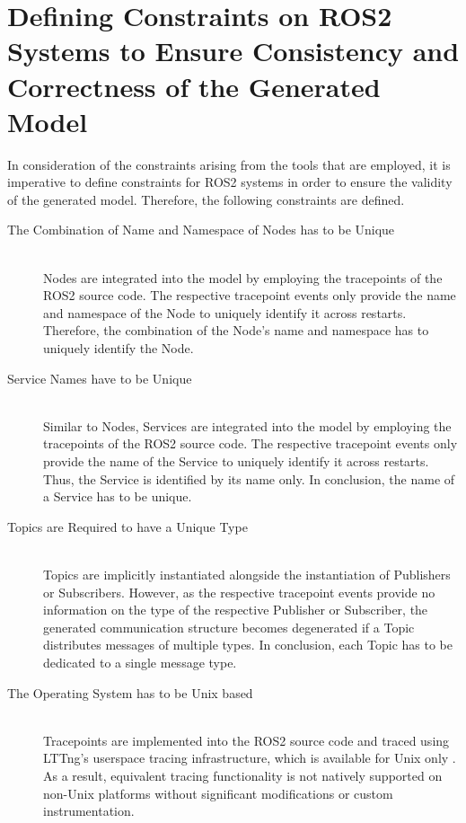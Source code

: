     \section{Defining Constraints on ROS2 Systems to Ensure Consistency and Correctness of the Generated Model} \label{sec:evaluation:limitations}
    In consideration of the constraints arising from the tools that are employed, it is imperative to define constraints for ROS2 systems in order to ensure the validity of the generated model. Therefore, the following constraints are defined.
        \begin{description}
            \item [The Combination of Name and Namespace of Nodes has to be Unique] \hfill \\
                Nodes are integrated into the model by employing the tracepoints of the ROS2 source code. The respective tracepoint events only provide the name and namespace of the Node to uniquely identify it across restarts. Therefore, the combination of the Node's name and namespace has to uniquely identify the Node.
            \item [Service Names have to be Unique] \hfill \\
                Similar to Nodes, Services are integrated into the model by employing the tracepoints of the ROS2 source code. The respective tracepoint events only provide the name of the Service to uniquely identify it across restarts. Thus, the Service is identified by its name only. In conclusion, the name of a Service has to be unique.
            \item [Topics are Required to have a Unique Type] \hfill \\
                Topics are implicitly instantiated alongside the instantiation of Publishers or Subscribers. However, as the respective tracepoint events provide no information on the type of the respective Publisher or Subscriber, the generated communication structure becomes degenerated if a Topic distributes messages of multiple types. In conclusion, each Topic has to be dedicated to a single message type.
            \item [The Operating System has to be Unix based] \hfill \\
                Tracepoints are implemented into the ROS2 source code and traced using LTTng's user\-space tracing infrastructure, which is available for Unix only \cite{website:lttng}. As a result, equivalent tracing functionality is not natively supported on non-Unix platforms without significant modifications or custom instrumentation.

\end{description}
